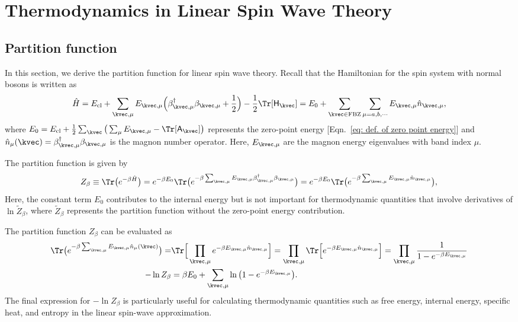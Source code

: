 \section{Thermodynamics in Linear Spin Wave Theory}

\subsection{Partition function}\label{subsec: Partition Function}
In this section, we derive the partition function for linear spin wave theory. 
Recall that the Hamiltonian for the spin system with normal bosons is written as 
\begin{align}
    \hat{H} = E_{\rm cl} + \sum_{\kvec, \mu} E_{\kvec, \mu} \Big( \beta^{\dagger}_{\kvec, \mu} \beta_{\kvec, \mu} + \frac{1}{2} \Big) - \frac{1}{2} \Tr [\mathsf{H}_{\kvec}] 
    = E_{0} + \sum_{\kvec \in \mathrm{FBZ}} \sum_{\mu = a, b, \cdots} E_{\kvec, \mu} \hat{n}_{\kvec, \mu},
\end{align}
where $E_{0} = E_{\rm cl} + \frac{1}{2} \sum_{\kvec} \big( \sum_{\mu} E_{\kvec, \mu} - \Tr [\mathsf{A}_{\kvec}] \big)$ represents the zero-point energy [Eqn.~\eqref{eq: def. of zero point energy}] and $\hat{n}_{\mu}(\kvec) = \beta^{\dagger}_{\kvec, \mu} \beta_{\kvec, \mu}$ is the magnon number operator. Here, $E_{\kvec, \mu}$ are the magnon energy eigenvalues with band index $\mu$.

The partition function is given by
\begin{equation}
    Z_{\beta} \equiv \Tr \big( e^{- \beta \hat{H}} \big) 
    = e^{- \beta E_{0}}  \Tr \big( e^{- \beta \sum_{\kvec, \mu} E_{\kvec, \mu} \beta^{\dagger}_{\kvec, \mu} \beta_{\kvec, \mu}} \big) 
    = e^{- \beta E_{0}} \Tr \big( e^{- \beta \sum_{\kvec, \mu} E_{\kvec, \mu} \hat{n}_{\kvec, \mu}} \big),
\end{equation}
Here, the constant term $E_0$ contributes to the internal energy but is not important for thermodynamic quantities that involve derivatives of $\ln \tilde{Z}_{\beta}$, where $\tilde{Z}_{\beta}$ represents the partition function without the zero-point energy contribution.

The partition function $Z_{\beta}$ can be evaluated as
\begin{subequations}\label{eq: explicit expressions for Z and log-Z}
    \begin{align}
        \Tr \big( e^{- \beta \sum_{\kvec, \mu} E_{\kvec, \mu} \hat{n}_{\mu}(\kvec)} \big) 
        = & \Tr \Big[ \prod_{\kvec, \mu} e^{- \beta E_{\kvec, \mu} \hat{n}_{\kvec, \mu}} \Big]
        = \prod_{\kvec, \mu} \Tr \Big[ e^{- \beta E_{\kvec, \mu} \hat{n}_{\kvec, \mu}} \Big] 
        =  \prod_{\kvec, \mu}  \frac{1}{1 - e^{- \beta E_{\kvec, \mu}}} \\
        - \ln Z_{\beta} &= \beta E_{0} + \sum_{\kvec, \mu} \ln \big( 1 - e^{- \beta E_{\kvec, \mu}} \big).
    \end{align}
\end{subequations}
The final expression for $-\ln Z_{\beta}$ is particularly useful for calculating thermodynamic quantities such as free energy, internal energy, specific heat, and entropy in the linear spin-wave approximation.


